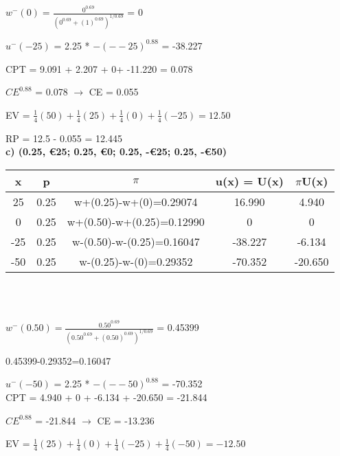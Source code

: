 \documentclass{article}
\begin{document}
$w^-(0) = \frac{0^{0.69}}{(0^{0.69}+(1)^{0.69})^{1/0.69}}$ = 0

$u^-(-25)$ = 2.25 * $-(--25)^{0.88}$ = -38.227 \\

\normalsize

CPT = 9.091 + 2.207 + 0+ -11.220 = 0.078

$CE^{0.88}$ = 0.078 $\rightarrow$ CE = 0.055

\vspace{1.5mm}

EV = $\frac{1}{4}(50)+\frac{1}{4}(25)+\frac{1}{4}(0)+\frac{1}{4}(-25)= 12.50 $

RP = 12.5 - 0.055 = 12.445 \\ 

\textbf{ c) (0.25, €25; 0.25, €0; 0.25, -€25; 0.25, -€50)}

\vspace{2mm}

   \begin{tabular}{|c|c|c|c|c|}
   	\hline
   	x  & p    & $\pi$                         & u(x) = U(x) & $\pi$U(x)  \\ \hline
   	25 & 0.25 & w+(0.25)-w+(0)=0.29074    & 16.990      & 4.940 \\ \hline
   	0 & 0.25 & w+(0.50)-w+(0.25)=0.12990 & 0     & 0  \\ \hline
   	-25 & 0.25 & w-(0.50)-w-(0.25)=0.16047 & -38.227      & -6.134  \\ \hline
   	-50  & 0.25 & w-(0.25)-w-(0)=0.29352    & -70.352           & -20.650      \\ \hline
   \end{tabular} \\ \\ 
 
 \Large
 
$w^-(0.50) = \frac{0.50^{0.69}}{(0.50^{0.69}+(0.50)^{0.69})^{1/0.69}}$ = 0.45399 \\

\normalsize

0.45399-0.29352=0.16047

$u^-(-50)$ = 2.25 * $-(--50)^{0.88}$ = -70.352 \\

CPT = 4.940 + 0 + -6.134 + -20.650 = -21.844

$CE^{0.88}$ = -21.844 $\rightarrow$ CE = -13.236

\vspace{1.5mm}

EV = $\frac{1}{4}(25)+\frac{1}{4}(0)+\frac{1}{4}(-25)+\frac{1}{4}(-50)= -12.50$
\end{document}
